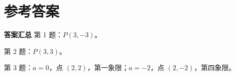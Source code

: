 \documentclass{exam-zh}
\begin{document}
\clearpage
\section*{参考答案}


\begin{keyideabox}
  \textbf{答案汇总}
  第 1 题：$P(3,-3)$。

第 2 题：$P(3,3)$。

第 3 题：$a=0$，点 $(2,2)$，第一象限；$a=-2$，点 $(2,-2)$，第四象限。

\end{keyideabox}
\end{document}
